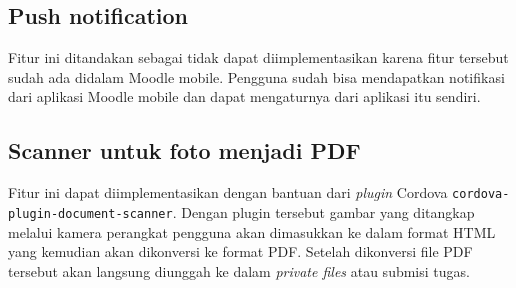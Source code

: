 \begin{table}[ht]
\caption{Hasil kuesioner untuk fitur apa yang diinginkan}
\centering
{}
\label{fitur yang diinginkan}
\end{table}

\subsection{Push notification}
\label{push notif}
Fitur ini ditandakan sebagai tidak dapat diimplementasikan karena fitur tersebut sudah ada didalam Moodle mobile. Pengguna sudah bisa mendapatkan notifikasi dari aplikasi Moodle mobile dan dapat mengaturnya dari aplikasi itu sendiri.

\subsection{Scanner untuk foto menjadi PDF} 
\label{PDF scanner}
Fitur ini dapat diimplementasikan dengan bantuan dari \textit{plugin} Cordova \texttt{cordova-plugin-document-scanner}. Dengan plugin tersebut gambar yang ditangkap melalui kamera perangkat pengguna akan dimasukkan ke dalam format HTML yang kemudian akan dikonversi ke format PDF. Setelah dikonversi file PDF tersebut akan langsung diunggah ke dalam \textit{private files} atau submisi tugas.

